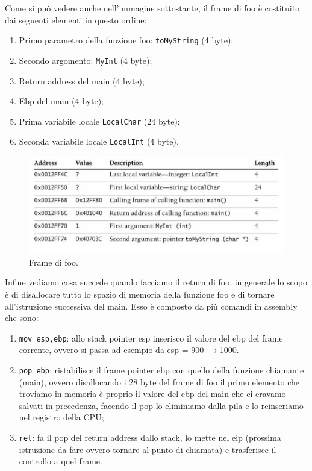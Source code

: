 Come si può vedere anche nell'immagine sottostante, il frame di foo è costituito dai seguenti elementi in questo ordine:
\begin{enumerate}
    \item Primo parametro della funzione foo: \verb|toMyString| (4 byte);
    \item Secondo argomento: \verb|MyInt| (4 byte);
    \item Return address del main (4 byte);
    \item Ebp del main (4 byte);
    \item Prima variabile locale \verb|LocalChar| (24 byte);
    \item Seconda variabile locale \verb|LocalInt|  (4 byte).
\end{enumerate}
\begin{figure}[H]
    \centering
    \includegraphics[width=13cm, keepaspectratio]{capitoli/secure_coding/img/cap_2/diss_stack.png}
    \caption{Frame di foo.}\label{fig:frame_foo}
\end{figure}
Infine vediamo cosa succede quando facciamo il return di foo, in generale lo scopo è di disallocare tutto lo spazio di memoria della funzione foo e di tornare all'istruzione successiva del main. Esso è composto da più comandi in assembly che sono:
\begin{enumerate}
    \item \verb|mov esp,ebp|: allo stack pointer esp inserisco il valore del ebp del frame corrente, ovvero si passa ad esempio da esp = 900 $\rightarrow$1000.
    \item \verb|pop ebp|: ristabilisce il frame pointer ebp con quello della funzione chiamante (main), ovvero disallocando i 28 byte del frame di foo il primo elemento che troviamo in memoria è proprio il valore del ebp del main che ci eravamo salvati in precedenza, facendo il pop lo eliminiamo dalla pila e lo reinseriamo nel registro della CPU;
    \item \verb|ret|: fa il pop del return address dallo stack, lo mette nel eip (prossima istruzione da fare ovvero tornare al punto di chiamata) e trasferisce il controllo a quel frame.
\end{enumerate}
